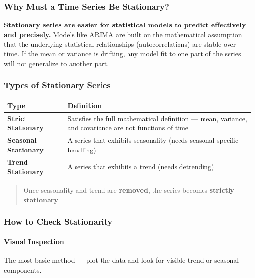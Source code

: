 \documentclass[12pt,openany]{book}
\begin{document}
\subsubsection{Why Must a Time Series Be Stationary?}

\textbf{Stationary series are easier for statistical models to predict effectively and precisely.} Models like ARIMA are built on the mathematical assumption that the underlying statistical relationships (autocorrelations) are stable over time. If the mean or variance is drifting, any model fit to one part of the series will not generalize to another part.

\subsubsection{Types of Stationary Series}

\begin{center}
\begin{tabular}{|L{0.28\textwidth}|L{0.62\textwidth}|}
\hline
Type & Definition \\
\hline
\textbf{Strict Stationary} & Satisfies the full mathematical definition --- mean, variance, and covariance are not functions of time \\
\hline
\textbf{Seasonal Stationary} & A series that exhibits seasonality (needs seasonal-specific handling) \\
\hline
\textbf{Trend Stationary} & A series that exhibits a trend (needs detrending) \\
\hline
\end{tabular}
\end{center}

\begin{quote}
Once seasonality and trend are \textbf{removed}, the series becomes \textbf{strictly stationary}.\par

\end{quote}

\subsubsection{How to Check Stationarity}

\paragraph{Visual Inspection}

The most basic method --- plot the data and look for visible trend or seasonal components.
\end{document}
